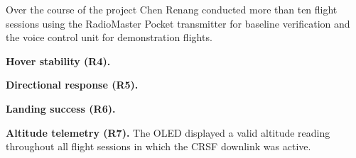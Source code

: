 Over the course of the project Chen Renang conducted more than ten flight sessions using the
RadioMaster Pocket transmitter for baseline verification and the voice control unit for
demonstration flights.

\textbf{Hover stability (R4).}

\textbf{Directional response (R5).}

\textbf{Landing success (R6).}

\textbf{Altitude telemetry (R7).}
The OLED displayed a valid altitude reading throughout all flight sessions in which the CRSF
downlink was active.

